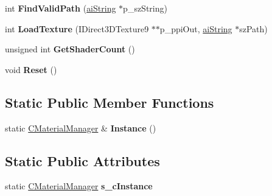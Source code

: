 \begin{DoxyCompactItemize}
\item 
\hypertarget{class_c_material_manager_a89728e68a80e036e6bf037bc68ff40bf}{int {\bfseries Find\+Valid\+Path} (\hyperlink{structai_string}{ai\+String} $\ast$p\+\_\+sz\+String)}\label{class_c_material_manager_a89728e68a80e036e6bf037bc68ff40bf}

\item 
\hypertarget{class_c_material_manager_af6523b0bb829da1d856e1e5097f65865}{int {\bfseries Load\+Texture} (I\+Direct3\+D\+Texture9 $\ast$$\ast$p\+\_\+ppi\+Out, \hyperlink{structai_string}{ai\+String} $\ast$sz\+Path)}\label{class_c_material_manager_af6523b0bb829da1d856e1e5097f65865}

\item 
\hypertarget{class_c_material_manager_a1ec640791d3c11781a9e961545fdf9f4}{unsigned int {\bfseries Get\+Shader\+Count} ()}\label{class_c_material_manager_a1ec640791d3c11781a9e961545fdf9f4}

\item 
\hypertarget{class_c_material_manager_a123f1559d775abfec9225ae6cbcede84}{void {\bfseries Reset} ()}\label{class_c_material_manager_a123f1559d775abfec9225ae6cbcede84}

\end{DoxyCompactItemize}
\subsection*{Static Public Member Functions}
\begin{DoxyCompactItemize}
\item 
\hypertarget{class_c_material_manager_a2a16d7dfc354674742f4fd924bb56017}{static \hyperlink{class_c_material_manager}{C\+Material\+Manager} \& {\bfseries Instance} ()}\label{class_c_material_manager_a2a16d7dfc354674742f4fd924bb56017}

\end{DoxyCompactItemize}
\subsection*{Static Public Attributes}
\begin{DoxyCompactItemize}
\item 
\hypertarget{class_c_material_manager_a38c3a1ac9d259d9c1b2d45e90928da66}{static \hyperlink{class_c_material_manager}{C\+Material\+Manager} {\bfseries s\+\_\+c\+Instance}}\label{class_c_material_manager_a38c3a1ac9d259d9c1b2d45e90928da66}

\end{DoxyCompactItemize}
